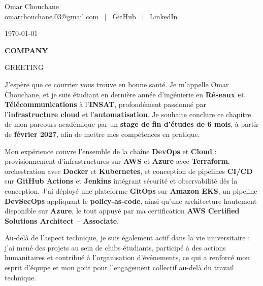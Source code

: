 \documentclass[12pt]{article}
\begin{document}

\begin{center}

{\Huge Omar Chouchane}\\[4pt]

\href{mailto:omarchouchane.03@gmail.com}{omarchouchane.03@gmail.com}
\ | \
\href{https://github.com/OmarChouchane}{GitHub}
\ | \
\href{https://linkedin.com/in/omar-chouchane-87215a201}{LinkedIn}

\end{center}

\vspace{10pt}

\today

\vspace{4pt}

\textbf{{{COMPANY}}}

\vspace{10pt}

{{GREETING}}

\vspace{5pt}

J'espère que ce courrier vous trouve en bonne santé. Je m'appelle Omar Chouchane, et je suis étudiant en dernière année d'ingénierie en \textbf{Réseaux et Télécommunications} à l'\textbf{INSAT}, profondément passionné par l'\textbf{infrastructure cloud} et l'\textbf{automatisation}. Je souhaite conclure ce chapitre de mon parcours académique par un \textbf{stage de fin d'études de 6 mois}, à partir de \textbf{février 2027}, afin de mettre mes compétences en pratique.

\vspace{5pt}

Mon expérience couvre l'ensemble de la chaîne \textbf{DevOps} et \textbf{Cloud} : provisionnement d'infrastructures sur \textbf{AWS} et \textbf{Azure} avec \textbf{Terraform}, orchestration avec \textbf{Docker} et \textbf{Kubernetes}, et conception de pipelines \textbf{CI/CD} sur \textbf{GitHub Actions} et \textbf{Jenkins} intégrant sécurité et observabilité dès la conception. J'ai déployé une plateforme \textbf{GitOps} sur \textbf{Amazon EKS}, un pipeline \textbf{DevSecOps} appliquant le \textbf{policy-as-code}, ainsi qu'une architecture hautement disponible sur \textbf{Azure}, le tout appuyé par ma certification \textbf{AWS Certified Solutions Architect -- Associate}.

\vspace{5pt}

Au-delà de l'aspect technique, je suis également actif dans la vie universitaire : j'ai mené des projets au sein de clubs étudiants, participé à des actions humanitaires et contribué à l'organisation d'événements, ce qui a renforcé mon esprit d'équipe et mon goût pour l'engagement collectif au-delà du travail technique.
\end{document}

